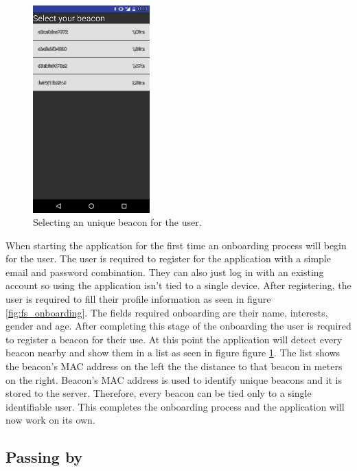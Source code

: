 \begin{figure}[htb]
	\begin{center}
		\includegraphics[width=0.4\textwidth]{registering_beacons.png}
		\caption{Selecting an unique beacon for the user.}
		\label{fig:fs_registerbeacons}
	\end{center}
\end{figure}


When starting the application for the first time an onboarding process will begin for the user. The user is required to register for the application with a simple email and password combination. They can also just log in with an existing account so using the application isn't tied to a single device. After registering, the user is required to fill their profile information as seen in figure \ref{fig:fs_onboarding}. The fields required onboarding are their name,  interests, gender and age. After completing this stage of the onboarding the user is required to register a beacon for their use. At this point the application will detect every beacon nearby and show them in a list as seen in figure figure \ref{fig:fs_registerbeacons}. The list shows the beacon's MAC address on the left the the distance to that beacon in meters on the right. Beacon's MAC address is used to identify unique beacons and it is stored to the server. Therefore, every beacon can be tied only to a single identifiable user. This completes the onboarding process and the application will now work on its own.

\subsection{Passing by}

